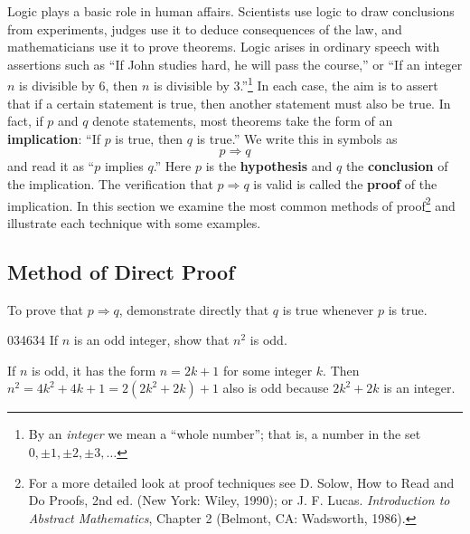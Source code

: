 
Logic plays a basic role in human 
affairs. Scientists use logic to draw conclusions from experiments, 
judges use it to deduce consequences of the law, and mathematicians use 
it to prove theorems. Logic arises in ordinary speech with assertions 
such as ``If John studies hard, he will pass the course,'' or ``If an 
integer $n$ is divisible by $6$, then $n$ is divisible by $3$.''\footnote{By an \textit{integer} we mean a ``whole number''; that is, a number in the set $0, \pm 1, \pm 2, \pm 3, \dots$ }
 In each case, the aim is to assert that if a certain statement is true, then another statement must also be true. In fact, if $p$ and $q$ denote statements, most theorems take the form of an \textbf{implication}: ``If $p$ is true, then $q$ is true.'' We write this in symbols as
\begin{equation*}
p \Rightarrow q 
\end{equation*}
and read it as ``$p$ implies $q$.'' Here $p$ is the \textbf{hypothesis} and $q$ the \textbf{conclusion} of the implication. The verification that $p \Rightarrow  q$ is valid is called the \textbf{proof} of the implication. In this section we examine the most common methods of proof\footnote{For a more detailed look at proof techniques see D. Solow, How to Read and 
Do Proofs, 2nd ed. (New York: Wiley, 1990); or J. F. Lucas. \textit{Introduction to Abstract Mathematics}, Chapter 2 (Belmont, CA: Wadsworth, 1986).}
 and illustrate each technique with some examples.


\subsection*{Method of Direct Proof}

To prove that $p \Rightarrow q$, demonstrate directly that $q$ is true whenever $p$ is true.

\begin{example}{}{034634}
If $n$ is an odd integer, show that $n^{2}$ is odd.


\begin{solution}
  If $n$ is odd, it has the form $n = 2k + 1$ for some integer $k$. Then $n^{2} = 4k^{2} + 4k + 1 = 2(2k^{2} + 2k) + 1$ also is odd because $2k^{2} + 2k$ is an integer.
\end{solution}
\end{example}


